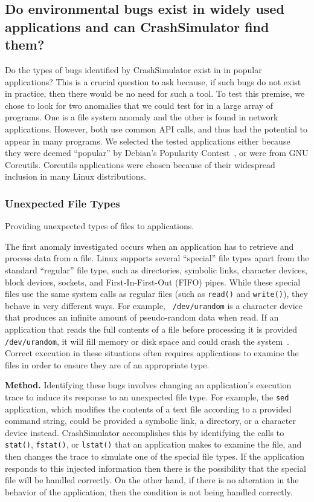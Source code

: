 \subsection{Do environmental bugs  exist in widely used applications and
can CrashSimulator find them?} \label{sec-env-bugs}

Do the types of bugs
identified by CrashSimulator exist in in popular applications?  This is a
crucial question to ask because,
if such bugs do not exist in practice, then there would be no need for
such a tool.  To test this premise,
we chose to look for two anomalies that we could test for in a large
array of programs.  One is a file system anomaly and the other is found in
network applications.
However, both use common API calls, and thus had the potential to
appear in many programs.  We selected the tested applications either
because they were deemed
``popular'' by Debian's Popularity Contest~\cite{DebPopCon}, or were from
GNU Coreutils.  Coreutils applications were chosen because of their
widespread inclusion in many Linux distributions.

\subsubsection{Unexpected File Types}
\label{sec-file-type-bugs}
Providing unexpected types of files to
applications.

The first anomaly investigated occurs when an application has to retrieve
and process data from a file.  Linux supports several ``special'' file
types apart from the standard ``regular'' file type, such as
directories, symbolic links, character devices, block devices, sockets, and
First-In-First-Out (FIFO) pipes.  While these special files
use the same system calls as regular files (such as {\tt read()} and
{\tt write()}), they behave in very different ways.  For example, {\tt
/dev/urandom} is a character device that produces an infinite amount of
pseudo-random data when read.  If an application that reads the full
contents of a file before processing it is provided {\tt /dev/urandom}, it
will fill memory or disk space and could
crash the system~\cite{YumAptEndless}.
Correct execution in these situations often requires applications
to examine the files in order to ensure they are of an appropriate type.

{\bf Method.}  Identifying these bugs involves changing an application's
execution trace to induce its response to an unexpected file type.  For
example, the {\tt sed} application, which modifies the contents of a text
file according to a provided command string, could be provided a symbolic
link, a directory, or a character device instead.  CrashSimulator
accomplishes this by identifying the calls to {\tt stat()}, {\tt fstat()},
or {\tt lstat()} that an application makes to examine the file, and then
changes the trace to simulate
one of the special file types.  If the application responds to
this injected information then there is the possibility that the special
file will be handled correctly.  On the other hand, if there is no
alteration in the behavior of the application,  then the condition is not
being handled correctly.

